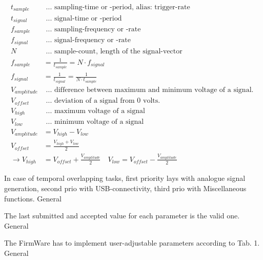 	\begin{align*}
	t_{sample} &\textrm{ ... sampling-time or -period, alias: trigger-rate } \\
	t_{signal} &\textrm{ ... signal-time or -period } \\
	f_{sample} &\textrm{ ... sampling-frequency or -rate } \\
	f_{signal} &\textrm{ ... signal-frequency or -rate } \\
	N &\textrm{ ... sample-count, length of the signal-vector } \\
	f_{sample} & = \frac{1}{t_{sample}} = N \cdot f_{signal} \\
	f_{signal} & = \frac{1}{t_{signal}} = \frac{1}{N \cdot t_{sample}} \\
	V_{amplitude} &\textrm{  ... difference between maximum and minimum voltage of a signal. } \\
	V_{offset} &\textrm{  ... deviation of a signal from 0 volts. } \\
	V_{high} &\textrm{  ... maximum voltage of a signal } \\
	V_{low} &\textrm{  ... minimum voltage of a signal } \\
	V_{amplitude} &= V_{high} - V_{low} \\ %
	V_{offset} &= \frac{V_{high} + V_{low}}{2} \\ %
	\rightarrow V_{high} &= V_{offset} + \frac{V_{amplitude}}{2} \quad V_{low} = V_{offset} - \frac{V_{amplitude}}{2}
	\end{align*}
	
	
	{ In case of temporal overlapping tasks, first priority lays with analogue signal generation, second prio with USB-connectivity, third prio with Miscellaneous functions. }
	{}{}{}{General}

	
	{ The last submitted and accepted value for each parameter is the valid one.}
	{}{}{}{General}

	{ The FirmWare has to implement user-adjustable parameters according to Tab. 1. }
	{}{}{}{General}
	
